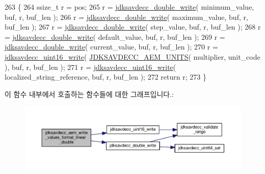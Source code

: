 \begin{DoxyCode}
263 \{
264     ssize\_t r = pos;
265     r = \hyperlink{group__endian_ga8d16ab87b5e89447e725d0088bc0e594}{jdksavdecc\_double\_write}( minimum\_value, buf, r, buf\_len );
266     r = \hyperlink{group__endian_ga8d16ab87b5e89447e725d0088bc0e594}{jdksavdecc\_double\_write}( maximum\_value, buf, r, buf\_len );
267     r = \hyperlink{group__endian_ga8d16ab87b5e89447e725d0088bc0e594}{jdksavdecc\_double\_write}( step\_value, buf, r, buf\_len );
268     r = \hyperlink{group__endian_ga8d16ab87b5e89447e725d0088bc0e594}{jdksavdecc\_double\_write}( default\_value, buf, r, buf\_len );
269     r = \hyperlink{group__endian_ga8d16ab87b5e89447e725d0088bc0e594}{jdksavdecc\_double\_write}( current\_value, buf, r, buf\_len );
270     r = \hyperlink{group__endian_ga4c0851ce17bde5306fdb04bfb5b75af1}{jdksavdecc\_uint16\_write}( \hyperlink{group__aem__descriptor_gae5f7498f6048b4dda1aca923b0eae0f6}{JDKSAVDECC\_AEM\_UNITS}( 
      multiplier, unit\_code ), buf, r, buf\_len );
271     r = \hyperlink{group__endian_ga4c0851ce17bde5306fdb04bfb5b75af1}{jdksavdecc\_uint16\_write}( localized\_string\_reference, buf, r, buf\_len );
272     \textcolor{keywordflow}{return} r;
273 \}
\end{DoxyCode}


이 함수 내부에서 호출하는 함수들에 대한 그래프입니다.\+:
\nopagebreak
\begin{figure}[H]
\begin{center}
\leavevmode
\includegraphics[width=350pt]{group__aem__descriptor_ga5e29903c4510817f13d17b5f273f9c45_cgraph}
\end{center}
\end{figure}


